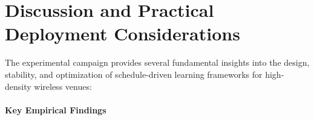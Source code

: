 \section{Discussion and Practical Deployment Considerations}
\label{sec:limits}

The experimental campaign provides several fundamental insights into the design, stability, and optimization of schedule-driven learning frameworks for high-density wireless venues:

\paragraph{Key Empirical Findings} 
